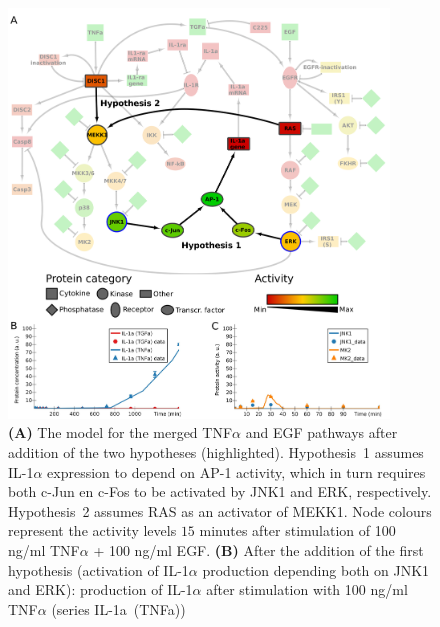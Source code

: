 \documentclass{bmcart}
\begin{document}
\begin{figure}[!htpb]
\begin{center}
  \includegraphics[width=0.9\textwidth]{Figures/5}
\end{center}
\caption{
{\bf(A)} %
The model for the merged TNF$\alpha$ and EGF pathways
after addition of the two hypotheses (highlighted).
Hypothesis~1 assumes IL-1$\alpha$ expression to depend on AP-1 activity, which in turn requires
both c-Jun en c-Fos to be activated by JNK1 and ERK, respectively. Hypothesis~2 assumes RAS as an activator
of MEKK1. Node colours represent the activity levels $15$ minutes
after stimulation of 100 ng/ml TNF$\alpha$ + 100 ng/ml EGF.
{\bf(B)} %
After the addition of the first hypothesis (activation of IL-1$\alpha$ production depending both
on JNK1 and ERK): production of IL-1$\alpha$ after stimulation with 100 ng/ml TNF$\alpha$ (series {\sf IL-1a~(TNFa)})
}
\end{figure}
\end{document}
